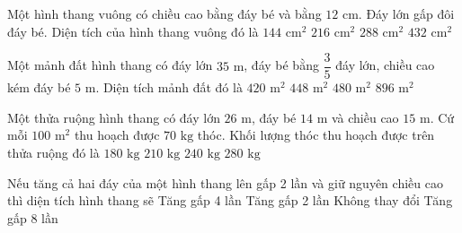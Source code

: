 \begin{ex} %
Một hình thang vuông có chiều cao bằng đáy bé và bằng $12\text{ cm}$. Đáy lớn gấp đôi đáy bé. Diện tích của hình thang vuông đó là
\choice
{$144\text{ cm}^2$}
{\True $216\text{ cm}^2$}
{$288\text{ cm}^2$}
{$432\text{ cm}^2$}
\end{ex}

\begin{ex} %
Một mảnh đất hình thang có đáy lớn $35\text{ m}$, đáy bé bằng $\dfrac{3}{5}$ đáy lớn, chiều cao kém đáy bé $5\text{ m}$. Diện tích mảnh đất đó là
\choice
{$420\text{ m}^2$}
{\True $448\text{ m}^2$}
{$480\text{ m}^2$}
{$896\text{ m}^2$}
\end{ex}

\begin{ex} %
Một thửa ruộng hình thang có đáy lớn $26\text{ m}$, đáy bé $14\text{ m}$ và chiều cao $15\text{ m}$. Cứ mỗi $100\text{ m}^2$ thu hoạch được $70\text{ kg}$ thóc. Khối lượng thóc thu hoạch được trên thửa ruộng đó là
\choice
{$180\text{ kg}$}
{\True $210\text{ kg}$}
{$240\text{ kg}$}
{$280\text{ kg}$}
\end{ex}

\begin{ex} %
Nếu tăng cả hai đáy của một hình thang lên gấp 2 lần và giữ nguyên chiều cao thì diện tích hình thang sẽ
\choice
{Tăng gấp 4 lần}
{\True Tăng gấp 2 lần}
{Không thay đổi}
{Tăng gấp 8 lần}
\end{ex}

